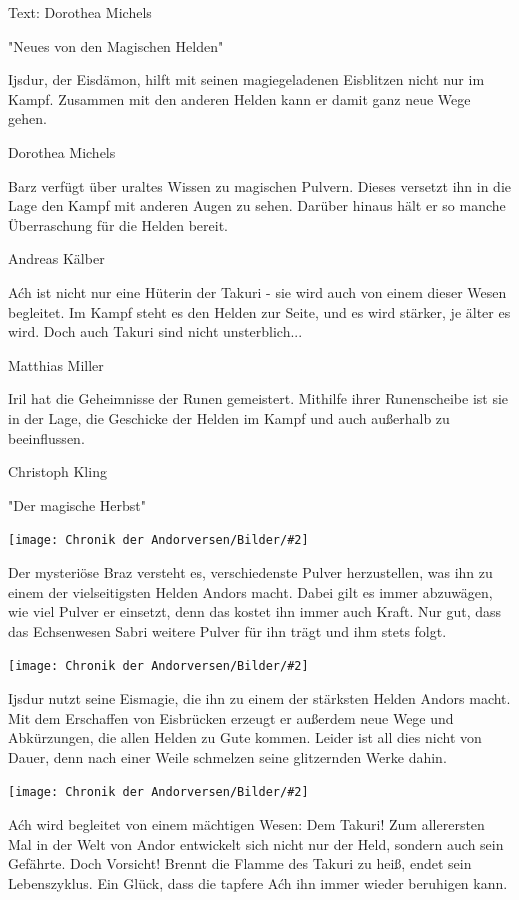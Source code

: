 \documentclass[10pt, a4paper, oneside]{book}
\newcommand{\bildmitts}[2][height=0.32\textwidth,width=0.48\textwidth,keepaspectratio]{%
    \begin{center}
        \texttt{[image: Chronik der Andorversen/Bilder/\#2]}
    \end{center}
}
\begin{document}
\begin{multicols}{2}
Text: Dorothea Michels\bigskip


\begin{center}
    "Neues von den Magischen Helden"
\end{center}

Ijsdur, der Eisdämon, hilft mit seinen magiegeladenen Eisblitzen nicht nur im Kampf. Zusammen mit den anderen Helden kann er
damit ganz neue Wege gehen.

Dorothea Michels\bigskip

Barz verfügt über uraltes Wissen zu magischen Pulvern. Dieses versetzt ihn in die Lage den Kampf mit anderen Augen zu sehen. Darüber hinaus hält er so manche Überraschung für die Helden bereit.

Andreas Kälber\bigskip

Aćh ist nicht nur eine Hüterin der Takuri - sie wird auch von einem dieser Wesen begleitet. Im Kampf steht es den Helden zur Seite, und es wird stärker, je älter es wird. Doch auch Takuri sind nicht unsterblich...

Matthias Miller\bigskip

Iril hat die Geheimnisse der Runen gemeistert. Mithilfe ihrer Runenscheibe ist sie in der Lage, die Geschicke der Helden im Kampf und auch außerhalb zu beeinflussen.

Christoph Kling


\begin{center}
    "Der magische Herbst"
\end{center}

\bildmitts{MH Promo 1.jpeg}

Der mysteriöse Braz versteht es, verschiedenste Pulver herzustellen, was ihn zu einem der vielseitigsten Helden Andors macht. Dabei gilt es immer abzuwägen, wie viel Pulver er einsetzt, denn das kostet ihn immer auch Kraft. Nur gut, dass das Echsenwesen Sabri weitere Pulver für ihn trägt und ihm stets folgt.

\bildmitts{MH Promo 2.jpeg}

Ijsdur nutzt seine Eismagie, die ihn zu einem der stärksten Helden Andors macht. Mit dem Erschaffen von Eisbrücken erzeugt er außerdem neue Wege und Abkürzungen, die allen Helden zu Gute kommen. Leider ist all dies nicht von Dauer, denn nach einer Weile schmelzen seine glitzernden Werke dahin.

\bildmitts{MH Promo 3.jpeg}

Aćh wird begleitet von einem mächtigen Wesen: Dem Takuri! Zum allerersten Mal in der Welt von Andor entwickelt sich nicht nur der Held, sondern auch sein Gefährte. Doch Vorsicht! Brennt die Flamme des Takuri zu heiß, endet sein Lebenszyklus. Ein Glück, dass die tapfere Aćh ihn immer wieder beruhigen kann.


\end{multicols}
\end{document}
